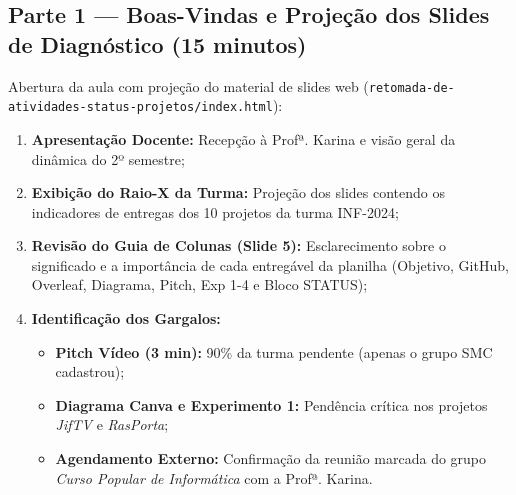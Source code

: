 

\subsection{Parte 1 — Boas-Vindas e Projeção dos Slides de Diagnóstico (15 minutos)}

\begin{boxAtividade}

Abertura da aula com projeção do material de slides web (\texttt{retomada-de-atividades-status-projetos/index.html}):

\begin{enumerate}
\item \textbf{Apresentação Docente:} Recepção à Profª. Karina e visão geral da dinâmica do 2º semestre;
\item \textbf{Exibição do Raio-X da Turma:} Projeção dos slides contendo os indicadores de entregas dos 10 projetos da turma INF-2024;
\item \textbf{Revisão do Guia de Colunas (Slide 5):} Esclarecimento sobre o significado e a importância de cada entregável da planilha (Objetivo, GitHub, Overleaf, Diagrama, Pitch, Exp 1-4 e Bloco STATUS);
\item \textbf{Identificação dos Gargalos:}
  \begin{itemize}
      \item \textbf{Pitch Vídeo (3 min):} 90\% da turma pendente (apenas o grupo SMC cadastrou);
      \item \textbf{Diagrama Canva e Experimento 1:} Pendência crítica nos projetos \textit{JifTV} e \textit{RasPorta};
      \item \textbf{Agendamento Externo:} Confirmação da reunião marcada do grupo \textit{Curso Popular de Informática} com a Profª. Karina.
  \end{itemize}
\end{enumerate}

\end{boxAtividade}


